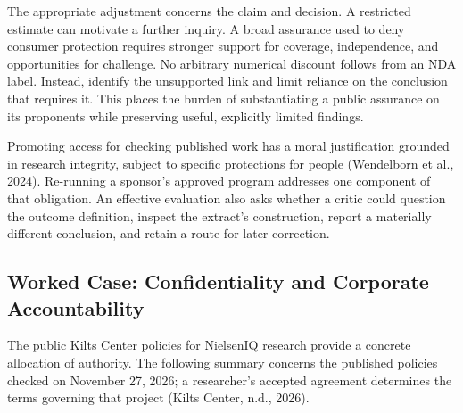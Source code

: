 The appropriate adjustment concerns the claim and decision. A restricted
estimate can motivate a further inquiry. A broad assurance used to deny
consumer protection requires stronger support for coverage,
independence, and opportunities for challenge. No arbitrary numerical
discount follows from an NDA label. Instead, identify the unsupported
link and limit reliance on the conclusion that requires it. This places
the burden of substantiating a public assurance on its proponents while
preserving useful, explicitly limited findings.

Promoting access for checking published work has a moral justification
grounded in research integrity, subject to specific protections for
people (Wendelborn et al., 2024). Re-running a sponsor's approved
program addresses one component of that obligation. An effective
evaluation also asks whether a critic could question the outcome
definition, inspect the extract's construction, report a materially
different conclusion, and retain a route for later correction.

\hypertarget{M09-worked-case-confidentiality-and-corporate-accountability}{%
\subsection{Worked Case: Confidentiality and Corporate
Accountability}\label{M09-worked-case-confidentiality-and-corporate-accountability}}

\noindent \noindent The public Kilts Center policies for NielsenIQ research
provide a concrete allocation of authority. The following summary
concerns the published policies checked on November 27, 2026; a
researcher's accepted agreement determines the terms governing that
project (Kilts Center, n.d., 2026).

